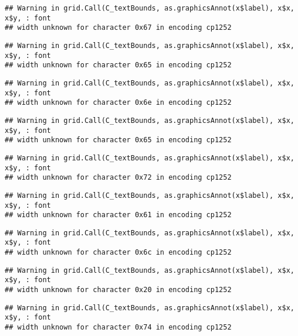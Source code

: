 \documentclass[
]{article}
\begin{document}
\begin{verbatim}
## Warning in grid.Call(C_textBounds, as.graphicsAnnot(x$label), x$x, x$y, : font
## width unknown for character 0x67 in encoding cp1252
\end{verbatim}

\begin{verbatim}
## Warning in grid.Call(C_textBounds, as.graphicsAnnot(x$label), x$x, x$y, : font
## width unknown for character 0x65 in encoding cp1252
\end{verbatim}

\begin{verbatim}
## Warning in grid.Call(C_textBounds, as.graphicsAnnot(x$label), x$x, x$y, : font
## width unknown for character 0x6e in encoding cp1252
\end{verbatim}

\begin{verbatim}
## Warning in grid.Call(C_textBounds, as.graphicsAnnot(x$label), x$x, x$y, : font
## width unknown for character 0x65 in encoding cp1252
\end{verbatim}

\begin{verbatim}
## Warning in grid.Call(C_textBounds, as.graphicsAnnot(x$label), x$x, x$y, : font
## width unknown for character 0x72 in encoding cp1252
\end{verbatim}

\begin{verbatim}
## Warning in grid.Call(C_textBounds, as.graphicsAnnot(x$label), x$x, x$y, : font
## width unknown for character 0x61 in encoding cp1252
\end{verbatim}

\begin{verbatim}
## Warning in grid.Call(C_textBounds, as.graphicsAnnot(x$label), x$x, x$y, : font
## width unknown for character 0x6c in encoding cp1252
\end{verbatim}

\begin{verbatim}
## Warning in grid.Call(C_textBounds, as.graphicsAnnot(x$label), x$x, x$y, : font
## width unknown for character 0x20 in encoding cp1252
\end{verbatim}

\begin{verbatim}
## Warning in grid.Call(C_textBounds, as.graphicsAnnot(x$label), x$x, x$y, : font
## width unknown for character 0x74 in encoding cp1252
\end{verbatim}
\end{document}
